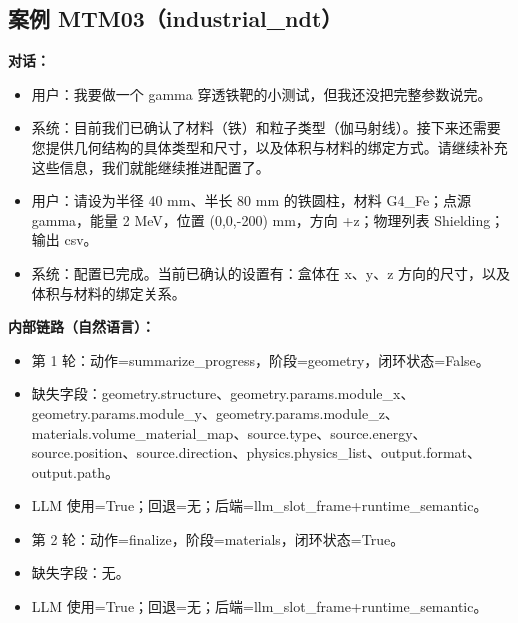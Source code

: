 \documentclass[11pt]{ctexart}
\begin{document}
\subsection{案例 MTM03（industrial\_ndt）}
\textbf{对话：}
\begin{itemize}
\item 用户：我要做一个 gamma 穿透铁靶的小测试，但我还没把完整参数说完。
\item 系统：目前我们已确认了材料（铁）和粒子类型（伽马射线）。接下来还需要您提供几何结构的具体类型和尺寸，以及体积与材料的绑定方式。请继续补充这些信息，我们就能继续推进配置了。
\item 用户：请设为半径 40 mm、半长 80 mm 的铁圆柱，材料 G4\_Fe；点源 gamma，能量 2 MeV，位置 (0,0,-200) mm，方向 +z；物理列表 Shielding；输出 csv。
\item 系统：配置已完成。当前已确认的设置有：盒体在 x、y、z 方向的尺寸，以及体积与材料的绑定关系。
\end{itemize}
\textbf{内部链路（自然语言）：}
\begin{itemize}
\item 第 1 轮：动作=summarize\_progress，阶段=geometry，闭环状态=False。
\item 缺失字段：geometry.structure、geometry.params.module\_x、geometry.params.module\_y、geometry.params.module\_z、materials.volume\_material\_map、source.type、source.energy、source.position、source.direction、physics.physics\_list、output.format、output.path。
\item LLM 使用=True；回退=无；后端=llm\_slot\_frame+runtime\_semantic。
\item 第 2 轮：动作=finalize，阶段=materials，闭环状态=True。
\item 缺失字段：无。
\item LLM 使用=True；回退=无；后端=llm\_slot\_frame+runtime\_semantic。
\end{itemize}
\end{document}
